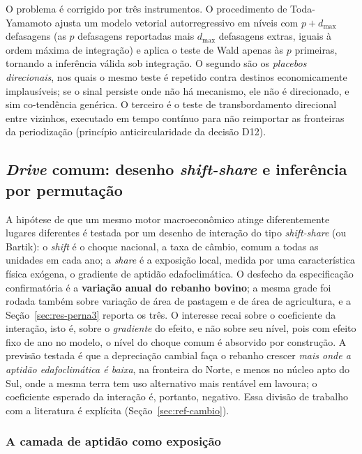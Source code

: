 O problema é corrigido por três instrumentos. O procedimento de Toda-Yamamoto
\cite{TodaYamamoto1995} ajusta um modelo vetorial autorregressivo em níveis
com $p + d_{\max}$ defasagens (as $p$ defasagens reportadas mais $d_{\max}$
defasagens extras, iguais à ordem máxima de integração) e aplica o teste de
Wald apenas às $p$ primeiras, tornando a inferência válida sob integração. O
segundo são os \emph{placebos direcionais}, nos quais o mesmo teste é repetido
contra destinos economicamente implausíveis; se o sinal persiste onde não há
mecanismo, ele não é direcionado, e sim co-tendência genérica. O terceiro é o
teste de transbordamento direcional entre vizinhos, executado em tempo
contínuo para não reimportar as fronteiras da periodização (princípio
anticircularidade da decisão D12).

\subsection{\emph{Drive} comum: desenho \emph{shift-share} e inferência por permutação}

A hipótese de que um mesmo motor macroeconômico atinge diferentemente lugares
diferentes é testada por um desenho de interação do tipo \emph{shift-share}
(ou Bartik): o \emph{shift} é o choque nacional, a taxa de câmbio, comum a
todas as unidades em cada ano; a \emph{share} é a exposição local, medida por
uma característica física exógena, o gradiente de aptidão edafoclimática. O
desfecho da especificação confirmatória é a \textbf{variação anual do rebanho
bovino}; a mesma grade foi rodada também sobre variação de área de pastagem e
de área de agricultura, e a Seção~\ref{sec:res-perna3} reporta os três. O
interesse recai sobre o coeficiente da interação, isto é, sobre o
\emph{gradiente} do efeito, e não sobre seu nível, pois com efeito fixo de ano no
modelo, o nível do choque comum é absorvido por construção. A previsão testada
é que a depreciação cambial faça o rebanho crescer \emph{mais onde a aptidão
edafoclimática é baixa}, na fronteira do Norte, e menos no núcleo apto do Sul,
onde a mesma terra tem uso alternativo mais rentável em lavoura; o coeficiente
esperado da interação é, portanto, negativo. Essa divisão de trabalho com a
literatura é explícita (Seção~\ref{sec:ref-cambio}).

\subsubsection*{A camada de aptidão como exposição}
\label{sec:met-aptidao}


